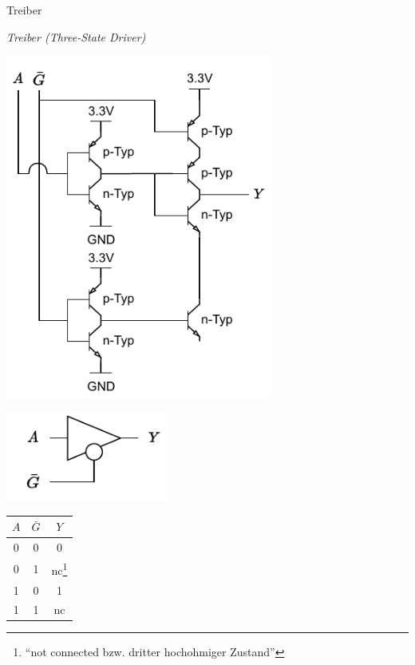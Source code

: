 \begin{defi}{Treiber}
    \begin{center}
        \emph{Treiber (Three-State Driver)}
    \end{center}

    \begin{minipage}{0.5\textwidth}
        \begin{center}
            \includegraphics[width=0.66\textwidth]{includes/figures/defi_driver.pdf}
        \end{center}
    \end{minipage}
    \begin{minipage}{0.5\textwidth}
        \begin{center}
            \includegraphics[width=0.4\textwidth]{includes/figures/defi_driver_symbol.pdf}

            \begin{tabular}{|c|c||c|}
                \hline
                $A$ & $\bar{G}$ & $Y$                                                                   \\\hline\hline
                0   & 0         & 0                                                                     \\\hline
                0   & 1         & nc\footnote{\enquote{not connected bzw. dritter hochohmiger Zustand}} \\\hline
                1   & 0         & 1                                                                     \\\hline
                1   & 1         & nc                                                                    \\\hline
            \end{tabular}
        \end{center}
    \end{minipage}
\end{defi}


